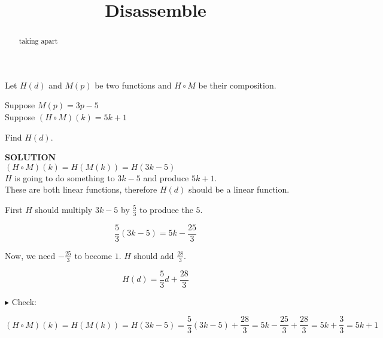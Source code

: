 \documentclass{ximera}
\title{Disassemble}
\begin{document}
\begin{abstract}
taking apart
\end{abstract}
\maketitle





\begin{example}


Let $H(d)$ and $M(p)$ be two functions and $H \circ M$ be their composition.


Suppose $M(p) = 3 p - 5$ \\

Suppose $(H \circ M)(k) = 5 k + 1$


Find $H(d)$.



\textbf{\textcolor{purple!50!blue!90!black}{SOLUTION}} \\




$(H \circ M)(k) = H(M(k)) = H(3 k - 5)$  \\



$H$ is going to do something to $3 k - 5$ and produce $5 k + 1$. \\




These are both linear functions, therefore $H(d)$ should be a linear function.


First $H$ should multiply $3 k - 5$ by $\frac{5}{3}$ to produce the $5$.


\[    \frac{5}{3} (3 k - 5) = 5k - \frac{25}{3}   \]



Now, we need $-\frac{25}{3}$ to become $1$.  $H$ should add $\frac{28}{3}$.

\[  H(d) =    \frac{5}{3} d +     \frac{28}{3} \]



$\blacktriangleright$ Check: 


\[    (H \circ M)(k) = H(M(k)) = H(3 k - 5) =    \frac{5}{3} (3 k - 5) +     \frac{28}{3}  = 5k - \frac{25}{3}  + \frac{28}{3}  = 5k + \frac{3}{3}  = 5k + 1\]

\end{example}
\end{document}
